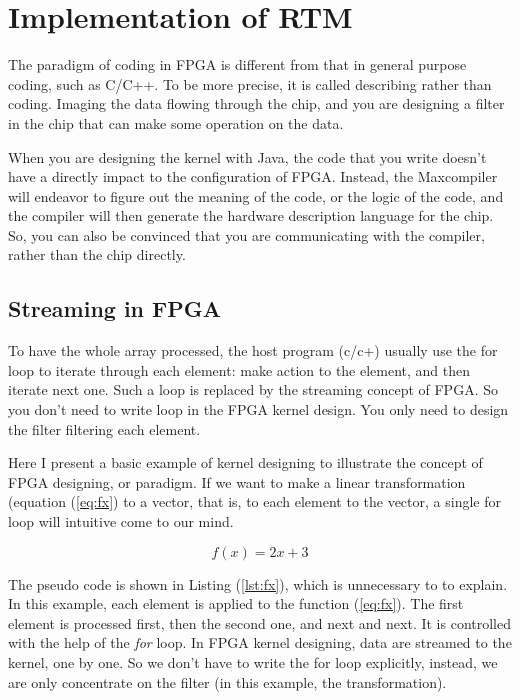 \section{Implementation of RTM} %

\label{sec:Implementation of FPGA}

The paradigm of coding in FPGA is different from that in general purpose
coding, such as C/C++. To be more precise, it is called describing rather
than coding. Imaging the data flowing through the chip, and you are
designing a filter in the chip that can make some operation on the data.

When you are designing the kernel with Java, the code that you write
doesn't have a directly impact to the configuration of FPGA. Instead, the
Maxcompiler will endeavor to figure out the meaning of the code, or the
logic of the code, and the compiler will then generate the hardware
description language for the chip. So, you can also be convinced that you
are communicating with the compiler, rather than the chip directly.

\subsection{Streaming in FPGA} %
\label{sub:Streaming in FPGA}

To have the whole array processed, the host program (c/c+) usually use the
for loop to iterate through each element: make action to the element, and
then iterate next one. Such a loop is replaced by the streaming concept of
FPGA. So you don't need to write loop in the FPGA kernel design. You only
need to design the filter filtering each element.

Here I present a basic example of kernel designing to illustrate the
concept of FPGA designing, or paradigm. If we want to make a linear
transformation (equation (\ref{eq:fx})
to a vector, that is, to each element to the vector, a single for loop will
intuitive come to our mind.

\begin{equation}
  f(x) = 2x + 3
  \label{eq:fx}
\end{equation}

The pseudo code is shown in Listing (\ref{lst:fx}), which is unnecessary to
to explain. In this example, each element is applied to the function
(\ref{eq:fx}). The first element is processed first, then the second one,
and next and next. It is controlled with the help of the \emph{for} loop.
In FPGA kernel designing, data are streamed to the kernel, one by one. So
we don't have to write the for loop explicitly, instead, we are only
concentrate on the filter (in this example, the transformation).

